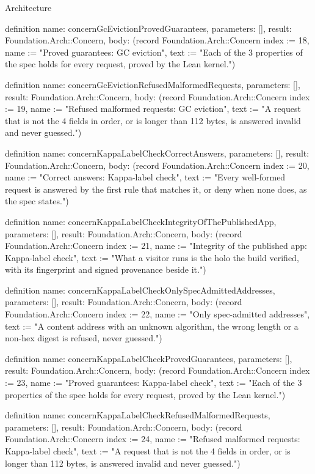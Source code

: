 \begin{lexlean}{Architecture}
\begin{semanticmodule}
definition{
  name: concernGcEvictionProvedGuarantees,
  parameters: [],
  result: Foundation.Arch::Concern,
  body: (record Foundation.Arch::Concern {index := 18, name := "Proved guarantees: GC eviction", text := "Each of the 3 properties of the spec holds for every request, proved by the Lean kernel."})
}

definition{
  name: concernGcEvictionRefusedMalformedRequests,
  parameters: [],
  result: Foundation.Arch::Concern,
  body: (record Foundation.Arch::Concern {index := 19, name := "Refused malformed requests: GC eviction", text := "A request that is not the 4 fields in order, or is longer than 112 bytes, is answered invalid and never guessed."})
}

definition{
  name: concernKappaLabelCheckCorrectAnswers,
  parameters: [],
  result: Foundation.Arch::Concern,
  body: (record Foundation.Arch::Concern {index := 20, name := "Correct answers: Kappa-label check", text := "Every well-formed request is answered by the first rule that matches it, or deny when none does, as the spec states."})
}

definition{
  name: concernKappaLabelCheckIntegrityOfThePublishedApp,
  parameters: [],
  result: Foundation.Arch::Concern,
  body: (record Foundation.Arch::Concern {index := 21, name := "Integrity of the published app: Kappa-label check", text := "What a visitor runs is the holo the build verified, with its fingerprint and signed provenance beside it."})
}

definition{
  name: concernKappaLabelCheckOnlySpecAdmittedAddresses,
  parameters: [],
  result: Foundation.Arch::Concern,
  body: (record Foundation.Arch::Concern {index := 22, name := "Only spec-admitted addresses", text := "A content address with an unknown algorithm, the wrong length or a non-hex digest is refused, never guessed."})
}

definition{
  name: concernKappaLabelCheckProvedGuarantees,
  parameters: [],
  result: Foundation.Arch::Concern,
  body: (record Foundation.Arch::Concern {index := 23, name := "Proved guarantees: Kappa-label check", text := "Each of the 3 properties of the spec holds for every request, proved by the Lean kernel."})
}

definition{
  name: concernKappaLabelCheckRefusedMalformedRequests,
  parameters: [],
  result: Foundation.Arch::Concern,
  body: (record Foundation.Arch::Concern {index := 24, name := "Refused malformed requests: Kappa-label check", text := "A request that is not the 4 fields in order, or is longer than 112 bytes, is answered invalid and never guessed."})
}


\end{semanticmodule}
\end{lexlean}
